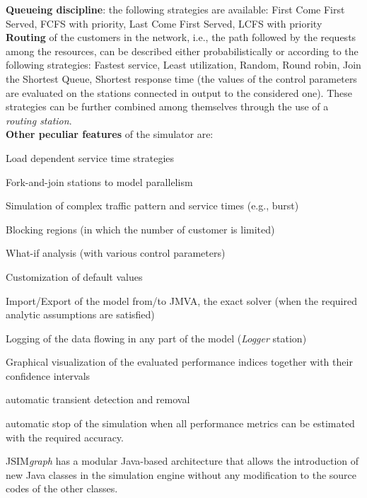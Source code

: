 \noindent \textbf{Queueing discipline}: the following strategies
are available:  First Come First Served, FCFS with priority, Last
Come First Served, LCFS with priority\\

\noindent \textbf{Routing} of the customers in the network, i.e.,
the path followed by the requests among the resources, can be
described either probabilistically or according to the following
strategies: Fastest service, Least utilization, Random, Round
robin, Join the Shortest Queue, Shortest response time (the values
of the control parameters are evaluated on the stations connected
in output to the considered one). These strategies can be further
combined among themselves through the use of a \emph{routing
station}.\\

\noindent \textbf{Other peculiar features} of the simulator are:
\vspace{-0.2cm}
\begin{itemize*}
    \item Load dependent service time strategies
    \item Fork-and-join stations to model parallelism
    \item Simulation of complex traffic pattern and service times (e.g., burst)
    \item Blocking regions (in which the number of customer is limited)
    \item What-if analysis (with various control parameters)
    \item Customization of default values
    \item Import/Export of the model from/to JMVA, the exact solver (when
    the required analytic assumptions are satisfied)
    \item Logging of the data flowing in any part of the model
    (\emph{Logger} station)
    \item Graphical visualization of the evaluated performance
    indices together with their confidence intervals
    \item automatic transient detection and removal
    \item automatic stop of the simulation when all performance
    metrics can be estimated with the required accuracy.
\end{itemize*}
JSIM\emph{graph} has a modular Java-based architecture that allows
the introduction of new Java classes in the simulation engine
without any modification to the source codes of the other classes.

